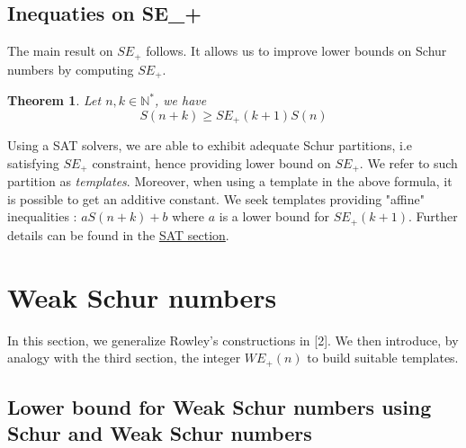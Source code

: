 \documentclass{article}
\newtheorem{theorem}{Theorem}[section]
\newtheorem{computational theorem}{Computational Theorem}[theorem]
\begin{document}
\subsection{Inequaties on SE_+} 

The main result on \(SE_+\) follows. It allows us to improve lower bounds on Schur numbers by computing \(SE_+\).

\begin{theorem}
Let \(n, k \in \mathbb{N}^*\), we have \\
\[ S(n+k) \geq SE_+(k+1)S(n) \]
\end{theorem}

Using a SAT solvers, we are able to exhibit adequate Schur partitions, i.e satisfying \(SE_+\) constraint, 
hence providing lower bound on \(SE_+\). We refer to such partition as \textit{templates}. Moreover, when using 
a template in the above formula, it is possible to get an additive constant. We seek templates providing "affine"
inequalities : \(aS(n+k) + b \) where \(a\) is a lower bound for \(SE_+(k+1)\). Further details can be found in the \hyperref[SAT]{SAT section}.
\subsection{}


\section{Weak Schur numbers}

In this section, we generalize Rowley's constructions in [2]. We then introduce, by analogy with the third section, the integer \(WE_+(n)\) 
to build suitable templates.

\subsection{Lower bound for Weak Schur numbers using Schur and Weak Schur numbers}
\end{document}
